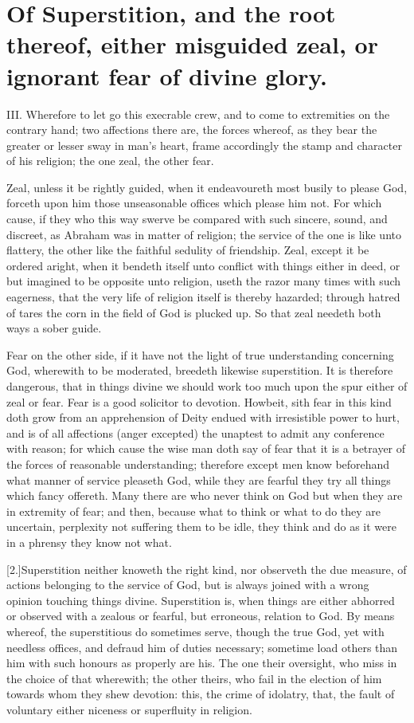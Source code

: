 \section*{Of Superstition, and the root thereof, either misguided zeal, or ignorant fear of divine glory.}
III. Wherefore to let go this execrable crew, and to come to extremities on the contrary hand; two affections there are, the forces whereof, as they bear the greater or lesser sway in man’s heart, frame accordingly the stamp and character of his religion; the one zeal, the other fear.

Zeal, unless it be rightly guided, when it endeavoureth most busily to please God, forceth upon him those unseasonable offices which please him not. For which cause, if they who this way swerve be compared with such sincere, sound,  and discreet, as Abraham was in matter of religion; the service of the one is like unto flattery, the other like the faithful sedulity of friendship.
 Zeal, except it be ordered aright, when it bendeth itself unto conflict with things either in deed, or but imagined to be opposite unto religion, useth the razor many times with such eagerness, that the very life of religion itself is thereby hazarded; through hatred of tares the corn in the field of God is plucked up. So that zeal needeth both ways a sober guide.

Fear on the other side, if it have not the light of true understanding concerning God, wherewith to be moderated, breedeth likewise superstition. It is therefore dangerous, that in things divine we should work too much upon the spur either of zeal or fear. Fear is a good solicitor to devotion. Howbeit, sith fear in this kind doth grow from an apprehension of Deity endued with irresistible power to hurt, and is of all affections (anger excepted) the unaptest to admit any conference with reason; for which cause the wise man doth say of fear that it is a betrayer of the forces of reasonable understanding; therefore except men know beforehand what manner of service pleaseth God, while they are fearful they try all things which fancy offereth. Many there are who never think on God but when they are in extremity of fear; and then, because what to think or what to do they are uncertain, perplexity not suffering them to be idle, they think and do as it were in a phrensy they know not what.

[2.]Superstition neither knoweth the right kind, nor observeth the due measure, of actions belonging to the service of God, but is always joined with a wrong opinion touching things divine. Superstition is, when things are either abhorred or observed with a zealous or fearful, but erroneous, relation to God. By means whereof, the superstitious do sometimes serve, though the true God, yet with needless offices, and defraud him of duties necessary; sometime load others than him with such honours as properly are his. The one their oversight, who miss in the choice of that wherewith; the other theirs, who fail in the election of him towards whom they shew devotion: this, the crime of idolatry, that, the fault of voluntary either niceness or superfluity in religion.




